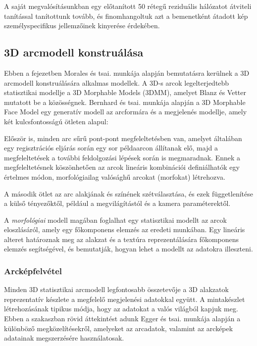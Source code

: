 \documentclass[12pt,a4]{article}
\begin{document}
    A saját megvalósításunkban egy előtanított 50 rétegű reziduális hálózatot átviteli tanítással tanítottunk tovább, és finomhangoltuk azt a bemenetként átadott kép személyspecifikus jellemzőinek kinyerése érdekében.

    \subsection{3D arcmodell konstruálása}
        \label{3d}

        Ebben a fejezetben Morales és tsai. \cite{survey} munkája alapján bemutatásra kerülnek a 3D arcmodell konstruálására alkalmas modellek.
         A 3D-s arcok legelterjedtebb statisztikai modellje a 3D Morphable Models (3DMM), amelyet Blanz és Vetter \cite{blanzvetter} mutatott be a közösségnek. Bernhard és tsai. \cite{3dmm} munkája alapján a 3D Morphable Face Model egy generatív modell az arcformára
        és a megjelenés modellje, amely két kulcsfontosságú ötleten alapul:
    	 
    	  Először is, minden arc
    	sűrű pont-pont megfeleltetésben van, amelyet általában egy regisztrációs eljárás során egy sor példaarcon állítanak elő, majd
        a megfeleltetések a további feldolgozási lépések során is megmaradnak. Ennek a megfeleltetésnek köszönhetően az arcok lineáris kombinációi definiálhatók egy értelmes módon, morfológiailag valósághű arcokat (morfokat) létrehozva.
    	 
    	 
    	A második ötlet az arc alakjának és színének szétválasztása, és ezek függetlenítése a külső tényezőktől, például a megvilágítástól és a kamera paraméterektől.
    	 
    	  A \textit{morfológiai} modell magában foglalhat egy statisztikai modellt
    	  az arcok eloszlásáról, amely egy főkomponens elemzés az eredeti munkában.
       Egy lineáris
       alteret határoznak meg az alakzat és a textúra reprezentálására főkomponens elemzés \cite{PCA} segítségével, és bemutatják, hogyan lehet a modellt az adatokra illeszteni. 

	 \subsubsection{Arcképfelvétel}
        Minden 3D statisztikai arcmodell legfontosabb összetevője a 3D alakzatok reprezentatív készlete a megfelelő megjelenési adatokkal együtt. A mintakészlet létrehozásának tipikus módja, hogy az adatokat a valós világból kapjuk meg. Ebben a szakaszban rövid áttekintést adunk Egger és tsai. \cite{3dmm} munkája alapján a különböző megközelítésekről, amelyeket az arcadatok, valamint az arcképek adatainak megszerzésére használatosak.
	  
\end{document}
